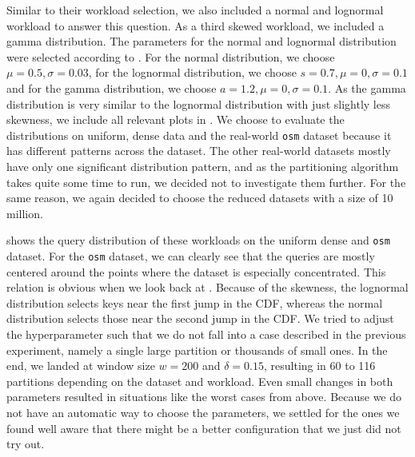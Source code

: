 \noindent Similar to their workload selection, we also included a normal and lognormal workload to answer this question. As a third skewed workload, we included a gamma distribution. The parameters for the normal and lognormal distribution were selected according to \citeauthor{Anneser2022}. For the normal distribution, we choose $\mu = 0.5, \sigma = 0.03$, for the lognormal distribution, we choose $s = 0.7, \mu = 0, \sigma = 0.1$ and for the gamma distribution, we choose $a = 1.2, \mu = 0, \sigma = 0.1$. As the gamma distribution is very similar to the lognormal distribution with just slightly less skewness, we include all relevant plots in . We choose to evaluate the distributions on uniform, dense data and the real-world \verb|osm| dataset because it has different patterns across the dataset. The other real-world datasets mostly have only one significant distribution pattern, and as the partitioning algorithm takes quite some time to run, we decided not to investigate them further. For the same reason, we again decided to choose the reduced datasets with a size of 10 million. 

 shows the query distribution of these workloads on the uniform dense and \verb|osm| dataset. For the \verb|osm| dataset, we can clearly see that the queries are mostly centered around the points where the dataset is especially concentrated. This relation is obvious when we look back at . Because of the skewness, the lognormal distribution selects keys near the first jump in the CDF, whereas the normal distribution selects those near the second jump in the CDF. We tried to adjust the hyperparameter such that we do not fall into a case described in the previous experiment, namely a single large partition or thousands of small ones. In the end, we landed at window size $w = 200$ and $\delta = 0.15$, resulting in 60 to 116 partitions depending on the dataset and workload. Even small changes in both parameters resulted in situations like the worst cases from above. Because we do not have an automatic way to choose the parameters, we settled for the ones we found well aware that there might be a better configuration that we just did not try out.

